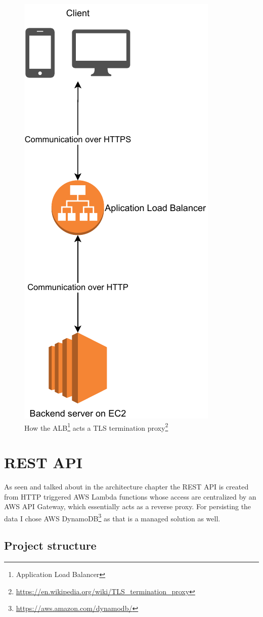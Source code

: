 \begin{figure}[H]
	\centering
	\includegraphics[width=.5\textwidth,keepaspectratio]{images/backend/server-proxy.pdf}
	\caption{How the ALB\footnote{Application Load Balancer} acts a TLS termination proxy\footnote{\href{https://en.wikipedia.org/wiki/TLS\_termination\_proxy}{https://en.wikipedia.org/wiki/TLS\_termination\_proxy}}}
	\label{figure:backend-stage-server-https}
\end{figure}


\section{REST API}

As seen and talked about in the architecture chapter the REST API is created from HTTP triggered AWS Lambda functions whose access are centralized by an AWS API Gateway, which essentially acts as a reverse proxy. For persisting the data I chose AWS DynamoDB\footnote{\href{https://aws.amazon.com/dynamodb/}{https://aws.amazon.com/dynamodb/}} as that is a managed solution as well.

\subsection{Project structure}

